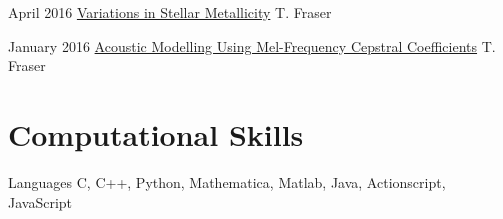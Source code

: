 \documentclass{article}
\begin{document}
        {
            \begin{paperlist}
                \item{April 2016}
                {\href{https://github.com/tcfraser/tcfraser.github.io/raw/master/documents/stellar_metallicity.pdf}{Variations in Stellar Metallicity}}
                {T. Fraser}
                {}
                \item{January 2016}
                {\href{https://github.com/tcfraser/tcfraser.github.io/raw/master/documents/MFCC.pdf}{Acoustic Modelling Using Mel-Frequency Cepstral Coefficients}}
                {T. Fraser}
                {}
            \end{paperlist}
        }

    \section{Computational Skills}
    \begin{computerlist}
        \item{Languages}
             {C, C++, Python, Mathematica, Matlab, Java, Actionscript, JavaScript}
    \end{computerlist}
    \clearpage
\end{document}
